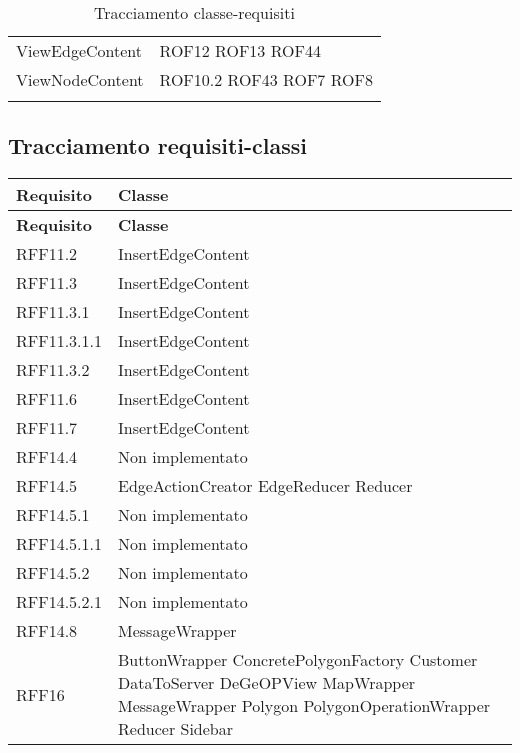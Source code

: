 \begin{longtable}{p{5cm}!{\VRule[1pt]}p{2.5cm}}
	ViewEdgeContent & ROF12 \newline ROF13 \newline ROF44\\
	ViewNodeContent & ROF10.2 \newline ROF43 \newline ROF7 \newline ROF8\\
	\caption{Tracciamento classe-requisiti}
\end{longtable}

\subsection{Tracciamento requisiti-classi}
\def\arraystretch{1.5}
\begin{longtable}{p{2.5cm}!{\VRule[1pt]}p{5cm}}
	\color{white} \textbf{Requisito} & \color{white} \textbf{Classe} \\ 
	\endfirsthead
	\color{white} \textbf{Requisito} & \color{white} \textbf{Classe} \\ 
	\endhead
	RFF11.2 & InsertEdgeContent\\
	RFF11.3 & InsertEdgeContent\\
	RFF11.3.1 & InsertEdgeContent\\
	RFF11.3.1.1 & InsertEdgeContent\\
	RFF11.3.2 & InsertEdgeContent\\
	RFF11.6 & InsertEdgeContent\\
	RFF11.7 & InsertEdgeContent\\
	RFF14.4 & Non implementato\\
	RFF14.5 & EdgeActionCreator \newline EdgeReducer \newline Reducer\\
	RFF14.5.1 & Non implementato \\
	RFF14.5.1.1 & Non implementato\\
	RFF14.5.2 & Non implementato\\
	RFF14.5.2.1 & Non implementato\\
	RFF14.8 & MessageWrapper\\
	RFF16 & ButtonWrapper \newline ConcretePolygonFactory \newline Customer \newline DataToServer \newline DeGeOPView \newline MapWrapper \newline MessageWrapper \newline Polygon \newline PolygonOperationWrapper \newline Reducer \newline Sidebar\\

\end{longtable}
